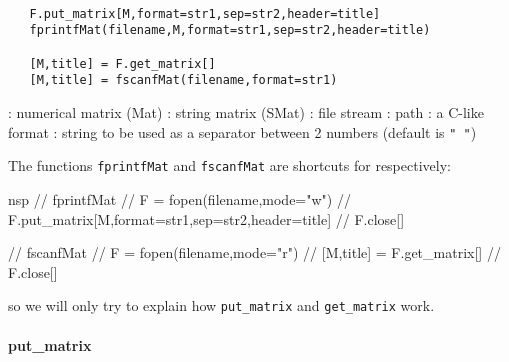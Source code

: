 

\begin{mandesc}
  \\
  \\
  \\
\end{mandesc}
\label{put-matrix}
\label{get-matrix}
\begin{calling_sequence}
\begin{verbatim}
   F.put_matrix[M,format=str1,sep=str2,header=title]
   fprintfMat(filename,M,format=str1,sep=str2,header=title)

   [M,title] = F.get_matrix[]
   [M,title] = fscanfMat(filename,format=str1)
\end{verbatim}
\end{calling_sequence}

\begin{parameters}
  \begin{varlist}
    : numerical matrix (Mat)
    : string matrix (SMat)
    : file stream
    : path
    : a C-like format
    : string to be used as a separator between 2 numbers (default is \verb+" "+)
  \end{varlist}
\end{parameters}

\begin{mandescription}
 The functions \verb+fprintfMat+ and \verb+fscanfMat+ are shortcuts for respectively:
 \begin{mintednsp}{nsp}
   // fprintfMat
   // F = fopen(filename,mode="w")
   // F.put_matrix[M,format=str1,sep=str2,header=title]
   // F.close[]

   // fscanfMat
   // F = fopen(filename,mode="r")
   // [M,title] = F.get_matrix[]
   // F.close[]
\end{mintednsp}
so we will only try to explain how \verb+put_matrix+ and \verb+get_matrix+ work.
\end{mandescription}

\paragraph{put\_matrix}

